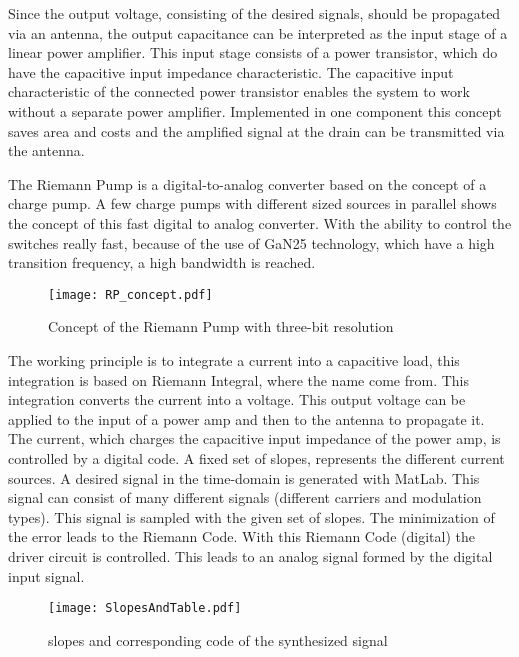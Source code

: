 Since the output voltage, consisting of the desired signals, should be propagated via an antenna, the output capacitance can be interpreted as the input stage of a linear power amplifier. 
This input stage consists of a power transistor, which do have the capacitive input impedance characteristic.
The capacitive input characteristic of the connected power transistor enables the system to work without a separate power amplifier.
Implemented in one component this concept saves area and costs and the amplified signal at the drain can be transmitted via the antenna.


The Riemann Pump is a digital-to-analog converter based on the concept of a charge pump. A few charge pumps with different sized sources in parallel shows the concept of this fast digital to analog converter. With the ability to control the switches really fast, because of the use of GaN25 technology, which have a high transition frequency, a high bandwidth is reached.

\begin{figure}[ht]
	\centering
  \texttt{[image: RP\_concept.pdf]}
	\caption{Concept of the Riemann Pump with three-bit resolution}
	\label{fig:RiemannPumpConcept}
\end{figure}

 The working principle is to integrate a current into a capacitive load, this integration is based on Riemann Integral, where the name come from. This integration converts the current into a voltage. This output voltage can be applied to the input of a power amp and then to the antenna to propagate it. The current, which charges the capacitive input impedance of the power amp, is controlled by a digital code. A fixed set of slopes, represents the different current sources. A desired signal in the time-domain is generated with MatLab. This signal can consist of many different signals (different carriers and modulation types). This signal is sampled with the given set of slopes. The minimization of the error leads to the Riemann Code. With this Riemann Code (digital) the driver circuit is controlled. This leads to an analog signal formed by the digital input signal. 
 
\begin{figure}[ht]
	\centering
  \texttt{[image: SlopesAndTable.pdf]}
	\caption{slopes and corresponding code of the synthesized signal}
	\label{fig:SlopesAndTable}
\end{figure}

